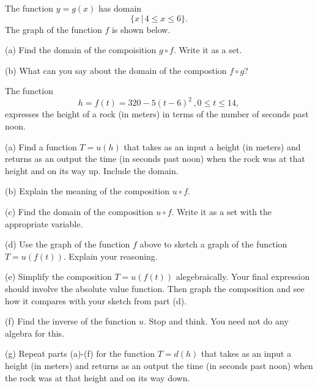 \documentclass{ximera}
\begin{document}
\begin{example} \label{Ex7:Quadratics}
The function $y=g(x)$ has domain
\[
   \{  x \, | \, 4 \leq x \leq 6   \}.
\]
The graph of the function $f$ is shown below.

(a) Find the domain of the compoisition $g\circ f$. Write it as a set.

(b) What can you say about the domain of the compostion $f\circ g$?


 
\begin{onlineOnly}
    \begin{center}
\end{center}
\end{onlineOnly}


\end{example}



\begin{example} \label{Ex8:Quadratics}
The function 
\[
   h = f(t) = 320 - 5 (t-6)^2 \, , 0\leq t \leq 14 ,
\]
expresses the height of a rock (in meters) in terms of the number of seconds past noon.

 
\begin{onlineOnly}
    \begin{center}
\end{center}
\end{onlineOnly}

(a) Find a function $T=u(h)$ that takes as an input a height (in meters) and returns as an output the time (in seconds past noon) when the rock was at that height and on its way up. Include the domain.

(b) Explain the meaning of the composition $u\circ f$.

(c) Find the domain of the composition $u\circ f$. Write it as a set with the appropriate variable.

(d) Use the graph of the function $f$ above to sketch a graph of the function $T= u(f(t))$. Explain your reasoning.

(e) Simplify the composition $T=u(f(t))$ alegebraically. Your final expression should involve the absolute value function. Then graph the composition and see how it compares with your sketch from part (d).  %

(f) Find the inverse of the function $u$. Stop and think. You need not do any algebra for this.

(g) Repeat parts (a)-(f) for the function $T=d(h)$ that takes as an input a height (in meters) and returns as an output the time (in seconds past noon) when the rock was at that height and on its way down.

\end{example}
\end{document}
